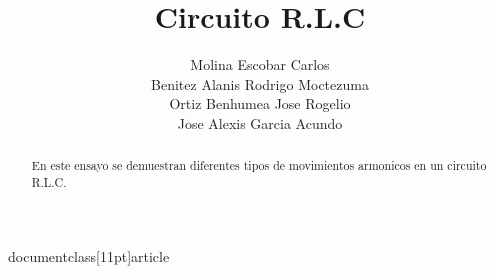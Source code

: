 documentclass[11pt]{article}

\usepackage[top=2cm, left=2cm, right=2cm, bottom=2cm]{geometry}
\usepackage{multicol}
\usepackage{graphicx}
\usepackage{caption}
\usepackage{enumitem}
\usepackage[spanish]{babel}
\usepackage{gensymb}
\usepackage{textcomp}
\usepackage{siunitx}

\title{Circuito R.L.C}
\author{Molina Escobar Carlos\\Benitez Alanis Rodrigo Moctezuma\\Ortiz Benhumea Jose Rogelio\\Jose Alexis Garcia Acundo}
\date{}

\newenvironment{Figuras}
  {\par\medskip\noindent\minipage{\linewidth}}
  {\endminipage\par\medskip}

\graphicspath{ {c:/Users/iwhalk/Documents/LaTex/Ondas_RLC/} }



\maketitle

\begin{abstract}
En este ensayo se demuestran diferentes tipos de movimientos armonicos en un circuito R.L.C.
\end{abstract}


